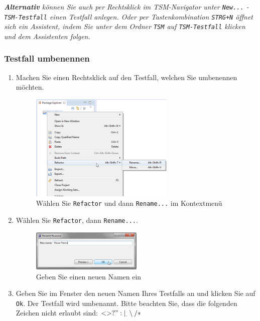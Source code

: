 \documentclass[11pt,a4paper,titlepage]{article}
\begin{document}
\textit{\textbf{Alternativ} können Sie auch per Rechtsklick im TSM-Navigator unter \texttt{New...} - \texttt{TSM-Testfall} einen Testfall anlegen.
Oder per Tastenkombination \texttt{STRG+N} öffnet sich ein Assistent, indem Sie unter dem Ordner \texttt{TSM} auf \texttt{TSM-Testfall} klicken und dem Assistenten folgen.}
\subsubsection{Testfall umbenennen}
\begin{enumerate}
\item Machen Sie einen Rechtsklick auf den Testfall, welchen Sie umbenennen möchten.

\begin{figure}[H]
\centering
\includegraphics[width= 260px]{BilderHandbuch/UmbenennenR.png}
\caption{Wählen Sie \texttt{Refactor} und dann \texttt{Rename...} im Kontextmenü}
\label{fig:UmbenennenR}
\end{figure}

\item Wählen Sie \texttt{Refactor}, dann \texttt{Rename...}.

\begin{figure}[H]
\centering
\includegraphics[width= 200px]{BilderHandbuch/UmbenennenFenster.png}
\caption{Geben Sie einen neuen Namen ein}
\label{fig:UmbenennenFenster}
\end{figure}

\item Geben Sie im Fenster den neuen Namen Ihres Testfalls an und klicken Sie auf \texttt{Ok}. Der Testfall wird umbenannt.
Bitte beachten Sie, dass die folgenden Zeichen nicht erlaubt sind: $ < > ? " : | _ . \setminus / *$
\end{enumerate}
\end{document}
